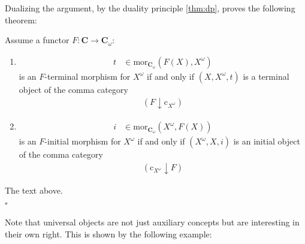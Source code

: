Dualizing the argument, by the duality principle \ref{thm:dp}, proves the following theorem:
\\
\begin{thm}
\label{thm:unimorequivuni}
Assume a functor $F \colon \mathbf{C} \rightarrow \mathbf{C}_{\omega}$:
\begin{enumerate}
\item[(1T)]
\begin{align*}
  t
  &\in
  \mathrm{mor}_{\mathbf{C}_{\omega}}(F(X),X^{\omega})
\end{align*}
is an $F$-terminal morphism for $X^{\omega}$ if and only if $(X,X^{\omega},t)$ is a terminal object of the comma category
\begin{align*}
  \left(
    F
    \downarrow
    \mathrm{c}_{X^{\omega}}
  \right)
\end{align*}
\item[(1I)]
\begin{align*}
  i
  &\in
  \mathrm{mor}_{\mathbf{C}_{\omega}}(X^{\omega},F(X))
\end{align*}
is an $F$-initial morphism for $X^{\omega}$ if and only if $(X^{\omega},X,i)$ is an initial object of the comma category
\begin{align*}
  \left(
    \mathrm{c}_{X^{\omega}}
    \downarrow
    F
  \right)
\end{align*}
\end{enumerate}
\end{thm}
\begin{prf}
The text above.
\\
\phantom{proven}
\hfill
$\square$
\end{prf}
Note that universal objects are not just auxiliary concepts but are interesting in their own right.
This is shown by the following example:
\\
